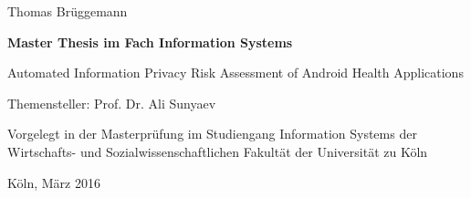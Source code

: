 \vspace*{1mm}

\thispagestyle{empty}
Thomas Brüggemann

\vspace*{23mm}

\begin{center}
\textbf{
    Master Thesis
\linebreak
    im Fach Information Systems}
\end{center}

\vspace*{20mm}

\begin{center}
\LARGE 
    Automated Information Privacy Risk Assessment of Android Health Applications
\end{center}

\vspace*{8mm}

\begin{center}
    Themensteller: Prof. Dr. Ali Sunyaev
\end{center}

\vspace*{12mm}

\begin{center}
    Vorgelegt in der Masterprüfung
\linebreak
    im Studiengang Information Systems
\linebreak
    der Wirtschafts- und Sozialwissenschaftlichen Fakultät
\linebreak
    der Universität zu Köln
\end{center}

\vspace*{30mm}

\begin{center}
Köln, März 2016
\end{center}


